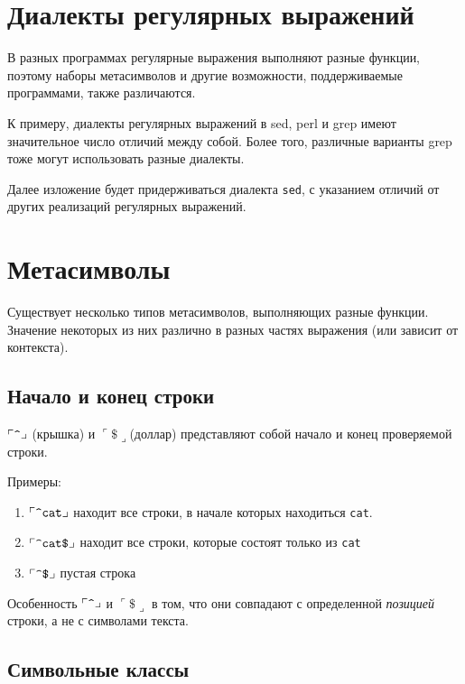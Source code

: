 \section{Диалекты регулярных выражений}

В разных программах регулярные выражения выполняют разные функции, поэтому наборы метасимволов и другие возможности, поддерживаемые программами, также различаются.

К примеру, диалекты регулярных выражений в sed, perl и grep имеют значительное число отличий между собой. Более того, различные варианты grep тоже могут использовать разные диалекты. 

Далее изложение будет придерживаться диалекта \verb+sed+, с указанием отличий от других реализаций регулярных выражений.
 
\section{Метасимволы}

Существует несколько типов метасимволов, выполняющих разные функции. Значение некоторых из них различно в разных частях выражения (или зависит от контекста).

\subsection{Начало и конец строки}

$\ulcorner\verb+^+\lrcorner$ (крышка) и  $\ulcorner \$ \lrcorner$(доллар) представляют собой начало и конец проверяемой строки.

Примеры:
\begin{enumerate}
\item \(\ulcorner \verb+^cat+ \lrcorner\) находит все строки, в начале которых находиться \verb+cat+.
\item \(\ulcorner \verb+^cat$+ \lrcorner\) находит все строки, которые состоят только из \verb+cat+
\item \(\ulcorner \verb+^$+ \lrcorner\) пустая строка
\end{enumerate}

Особенность $\ulcorner \verb+^+ \lrcorner$ и $\ulcorner \$ \lrcorner$ в том, что они совпадают с определенной \emph{позицией} строки, а не с символами текста.

\subsection{Символьные классы}

